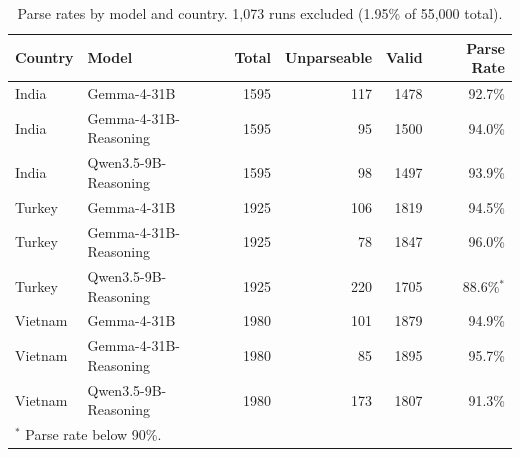 \begin{table}[t]
\centering\footnotesize
\setlength{\tabcolsep}{5pt}
\begin{tabular}{llrrrr}
\toprule
Country & Model & Total & Unparseable & Valid & Parse Rate \\
\midrule
India & Gemma-4-31B & 1595 & 117 & 1478 & 92.7\% \\
India & Gemma-4-31B-Reasoning & 1595 & 95 & 1500 & 94.0\% \\
India & Qwen3.5-9B-Reasoning & 1595 & 98 & 1497 & 93.9\% \\
Turkey & Gemma-4-31B & 1925 & 106 & 1819 & 94.5\% \\
Turkey & Gemma-4-31B-Reasoning & 1925 & 78 & 1847 & 96.0\% \\
Turkey & Qwen3.5-9B-Reasoning & 1925 & 220 & 1705 & 88.6\%$^{*}$ \\
Vietnam & Gemma-4-31B & 1980 & 101 & 1879 & 94.9\% \\
Vietnam & Gemma-4-31B-Reasoning & 1980 & 85 & 1895 & 95.7\% \\
Vietnam & Qwen3.5-9B-Reasoning & 1980 & 173 & 1807 & 91.3\% \\
\bottomrule
\multicolumn{6}{l}{\footnotesize $^{*}$ Parse rate below 90\%.}\\
\end{tabular}
\caption{Parse rates by model and country. 1,073 runs excluded (1.95\% of 55,000 total).}
\label{tab:parse-rate}
\end{table}
